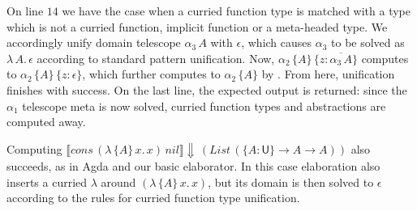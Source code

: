 \documentclass[acmsmall,review,anonymous,prologue,dvipsnames]{acmart}\settopmatter{printfolios=true,printccs=false,printacmref=false}
\newcommand{\slet}{\boldsymbol{\mathsf{let}}}
\renewcommand{\sin}{\boldsymbol{\mathsf{in}}}
\renewcommand{\U}{\mathsf{U}}
\newcommand{\emptycon}{\scaleobj{.75}\bullet}
\newcommand{\unify}{\mathsf{unify}}
\newcommand{\mi}[1]{\mathit{#1}}
\newcommand{\echeckt}[2]{\llbracket#1\rrbracket\!\Downarrow\,#2}
\newcommand{\einfert}[1]{\llbracket#1\rrbracket\!\Uparrow}
\newcommand{\true}{\mathsf{true}}
\newcommand{\Tel}{\mathsf{Tel}}
\newcommand{\Rec}{\mathsf{Rec}}
\newcommand{\ol}[1]{\overline{#1}}
\theoremstyle{remark}
\begin{document}
\begin{example}
On line $\scriptstyle{14}$ we have the case when a curried function type is
matched with a type which is not a curried function, implicit function or a
meta-headed type. We accordingly unify domain telescope $\alpha_3\,A$ with
$\epsilon$, which causes $\alpha_3$ to be solved as $\lambda\,A.\,\epsilon$
according to standard pattern unification. Now, $\alpha_2\,\{A\}\,\{z :
\ol{\alpha_3\,A}\}$ computes to $\alpha_2\,\{A\}\,\{z : \epsilon\}$, which
further computes to $\alpha_2\,\{A\}$ by . From here,
unification finishes with success. On the last line, the expected output is
returned: since the $\alpha_1$ telescope meta is now solved, curried function
types and abstractions are computed away.

Computing
$\echeckt{\mi{cons}\,(\lambda\,\{A\}\,x.\,x)\,\mi{nil}}{(\mi{List}\,(\{A :
  \U\}\to A \to A))}$ also succeeds, as in Agda and our basic elaborator. In
this case elaboration also inserts a curried $\lambda$ around
$(\lambda\,\{A\}\,x.\,x)$, but its domain is then solved to $\epsilon$ according
to the rules for curried function type unification.

\end{example}

\end{document}
